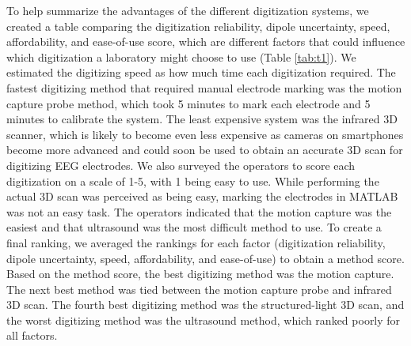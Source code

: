 \documentclass[../thesis_seyed.tex]{subfiles}
\begin{document}
To help summarize the advantages of the different digitization systems, we created a table comparing the digitization reliability, dipole uncertainty, speed, affordability, and ease-of-use score, which are different factors that could influence which digitization a laboratory might choose to use (Table \ref{tab:t1}). We estimated the digitizing speed as how much time each digitization required. The fastest digitizing method that required manual electrode marking was the motion capture probe method, which took 5 minutes to mark each electrode and 5 minutes to calibrate the system. The least expensive system was the infrared 3D scanner, which is likely to become even less expensive as cameras on smartphones become more advanced and could soon be used to obtain an accurate 3D scan for digitizing EEG electrodes. We also surveyed the operators to score each digitization on a scale of 1-5, with 1 being easy to use. While performing the actual 3D scan was perceived as being easy, marking the electrodes in MATLAB was not an easy task. The operators indicated that the motion capture was the easiest and that ultrasound was the most difficult method to use. To create a final ranking, we averaged the rankings for each factor (digitization reliability, dipole uncertainty, speed, affordability, and ease-of-use) to obtain a method score. Based on the method score, the best digitizing method was the motion capture. The next best method was tied between the motion capture probe and infrared 3D scan. The fourth best digitizing method was the structured-light 3D scan, and the worst digitizing method was the ultrasound method, which ranked poorly for all factors.
\end{document}
